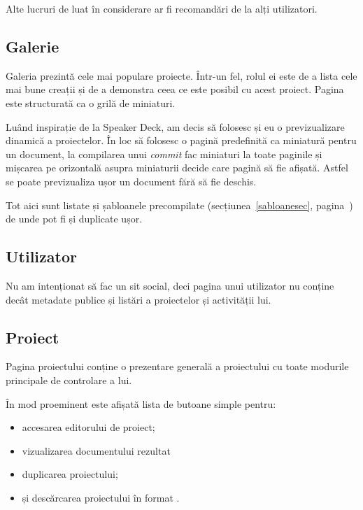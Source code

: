 \documentclass[a4wide,12pt]{report}
\newcommand{\eng}[1]{\emph{#1}} %
\newcommand{\acr}[1]{{\textsmaller[1]{\textsc{#1}}}} %
\begin{document}
Alte lucruri de luat în considerare ar fi recomandări de la alți utilizatori.

\subsection{Galerie}
\label{galeriesub}

Galeria prezintă cele mai populare proiecte. Într-un fel, rolul ei este de a
lista cele mai bune creații și de a demonstra ceea ce este posibil cu acest
proiect. Pagina este structurată ca o grilă de miniaturi.

Luând inspirație de la Speaker Deck, am decis să folosesc și eu o
previzualizare dinamică a proiectelor. În loc să folosesc o pagină predefinită
ca miniatură pentru un document, la compilarea unui \eng{commit} fac miniaturi
la toate paginile și mișcarea pe orizontală asupra miniaturii decide care pagină
să fie afișată. Astfel se poate previzualiza ușor un document fără să fie
deschis.

Tot aici sunt listate și șabloanele precompilate (secțiunea~\ref{sabloanesec},
pagina~\pageref{sabloanesec}) de unde pot fi și duplicate ușor.

\subsection{Utilizator}

Nu am intenționat să fac un sit social, deci pagina unui utilizator nu conține
decât metadate publice și listări a proiectelor și activității lui.

\subsection{Proiect}

Pagina proiectului conține o prezentare generală a proiectului cu toate modurile
principale de controlare a lui.

În mod proeminent este afișată lista de butoane simple pentru:

\begin{itemize}

\item accesarea editorului de proiect;

\item vizualizarea documentului \acr{PDF} rezultat

\item duplicarea proiectului;

\item și descărcarea proiectului în format \acr{ZIP}.

\end{itemize}
\end{document}
